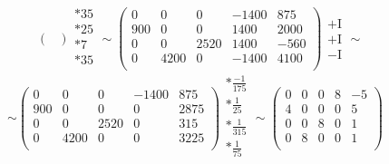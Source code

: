 \begin{enumerate}
\[\begin{pmatrix}
		      \end{pmatrix}
		      \begin{array}{c}
			      *35 \\
			      *25 \\
			      *7  \\
			      *35 \\
		      \end{array}
		      \sim
		      \begin{pmatrix}
			      0   & 0    & 0    & -1400 & 875  \\
			      900 & 0    & 0    & 1400  & 2000 \\
			      0   & 0    & 2520 & 1400  & -560 \\
			      0   & 4200 & 0    & -1400 & 4100 \\
		      \end{pmatrix}
		      \begin{array}{c}
			      \\
			      +\text{I} \\
			      +\text{I} \\
			      -\text{I} \\
		      \end{array}
		      \sim
	      \]
	      \[
		      \sim
		      \begin{pmatrix}
			      0   & 0    & 0    & -1400 & 875  \\
			      900 & 0    & 0    & 0     & 2875 \\
			      0   & 0    & 2520 & 0     & 315  \\
			      0   & 4200 & 0    & 0     & 3225 \\
		      \end{pmatrix}
		      \begin{array}{c}
			      *\frac{-1}{175} \\
			      *\frac{1}{25}   \\
			      *\frac{1}{315}  \\
			      *\frac{1}{75}   \\
		      \end{array}
		      \sim
		      \begin{pmatrix}
			      0 & 0 & 0 & 8 & -5 \\
			      4 & 0 & 0 & 0 & 5  \\
			      0 & 0 & 8 & 0 & 1  \\
			      0 & 8 & 0 & 0 & 1  \\
		      \end{pmatrix}
		      \begin{array}{c}

\end{array}\]
\end{enumerate}
